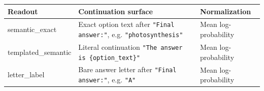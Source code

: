 \begin{tabularx}{\linewidth}{@{}lXl@{}}
\toprule
Readout & Continuation surface & Normalization \\
\midrule
semantic\_exact & Exact option text after \texttt{"Final answer:"}, e.g. \texttt{"photosynthesis"} & Mean log-probability \\
templated\_semantic & Literal continuation \texttt{"The answer is \{option\_text\}"} & Mean log-probability \\
letter\_label & Bare answer letter after \texttt{"Final answer:"}, e.g. \texttt{"A"} & Mean log-probability \\
\bottomrule
\end{tabularx}
